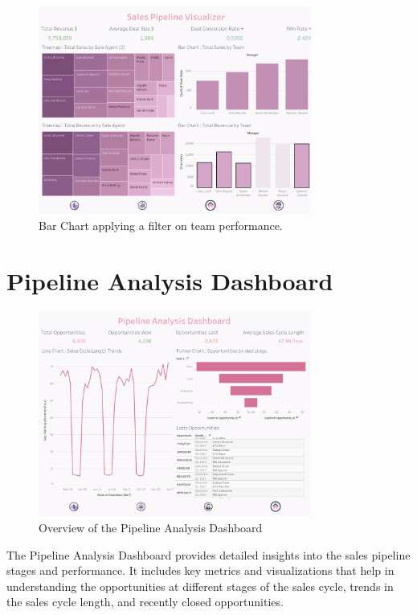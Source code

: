 \documentclass{article}
\begin{document}
\begin{figure}[h!]
    \centering
    \includegraphics[width=0.8\textwidth]{resources/swappy-20240527_160924.png}
    \caption{Bar Chart applying a filter on team performance.}
    \label{fig:team_performance_bar_chart_filter}
\end{figure}

\clearpage

\section{Pipeline Analysis Dashboard}
\begin{figure}[h!]
    \centering
    \includegraphics[width=0.8\textwidth]{resources/swappy-20240527_170251.png}
    \caption{Overview of the Pipeline Analysis Dashboard}
    \label{fig:pipeline_analysis_dashboard_overview}
\end{figure}
The Pipeline Analysis Dashboard provides detailed insights into the sales pipeline stages and performance. It includes key metrics and visualizations that help in understanding the opportunities at different stages of the sales cycle, trends in the sales cycle length, and recently closed opportunities.
\end{document}
